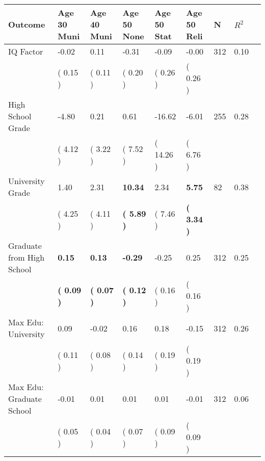 \begin{tabular}{L{6.2cm} C{1.8cm} C{1.8cm} C{1.8cm} C{1.8cm} C{1.8cm} C{1.8cm} C{0.3cm} C{0.3cm}}
\toprule
 \textbf{Outcome} & \textbf{Age 30 Muni} & \textbf{Age 40 Muni} & \textbf{Age 50 None} & \textbf{Age 50 Stat} & \textbf{Age 50 Reli} & \textbf{N} & \textbf{$ R^2$} \\
\midrule
IQ Factor &     -0.02 &      0.11 &     -0.31 &     -0.09 &     -0.00  & 312 &       0.10 \\ 
 & (     0.15 ) & (     0.11 ) & (     0.20 ) & (     0.26 ) & (     0.26 )  & \\
High School Grade &     -4.80 &      0.21 &      0.61 &    -16.62 &     -6.01  & 255 &       0.28 \\ 
 & (     4.12 ) & (     3.22 ) & (     7.52 ) & (    14.26 ) & (     6.76 )  & \\
University Grade &      1.40 &      2.31 & \textbf{    10.34} &      2.34 & \textbf{     5.75}  & 82 &       0.38 \\ 
 & (     4.25 ) & (     4.11 ) & \textbf{(     5.89 )} & (     7.46 ) & \textbf{(     3.34 )}  & \\
Graduate from High School & \textbf{     0.15} & \textbf{     0.13} & \textbf{    -0.29} &     -0.25 &      0.25  & 312 &       0.25 \\ 
 & \textbf{(     0.09 )} & \textbf{(     0.07 )} & \textbf{(     0.12 )} & (     0.16 ) & (     0.16 )  & \\
Max Edu: University &      0.09 &     -0.02 &      0.16 &      0.18 &     -0.15  & 312 &       0.26 \\ 
 & (     0.11 ) & (     0.08 ) & (     0.14 ) & (     0.19 ) & (     0.19 )  & \\
Max Edu: Graduate School &     -0.01 &      0.01 &      0.01 &      0.01 &     -0.01  & 312 &       0.06 \\ 
 & (     0.05 ) & (     0.04 ) & (     0.07 ) & (     0.09 ) & (     0.09 )  & \\
\bottomrule
\end{tabular}
